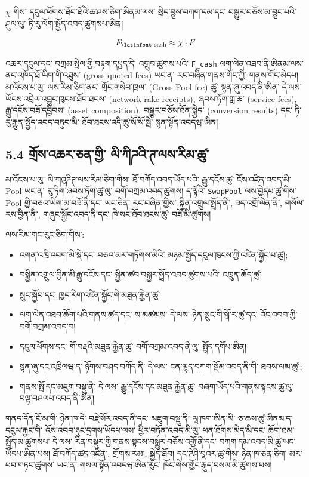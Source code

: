 \documentclass[11pt]{article}
\begin{document}
\texttt{$\chi$} གིས་ དངུལ་ཕོགས་ཐོབ་ཐོའི་ཆ་ཤས་ཅིག་ཨིནམ་ལས་ སྲིད་བྱུས་བཀག་དམ་དང་ བསྒྱུར་བཅོས་མ་བྱུང་པའི་ཤུལ་ལུ་ ཏི་རུ་ལོག་སྤྱོད་འབད་ཚུགསཔ་ཨིན།

\[
F_{\text{\latinfont cash}} \approx \chi \cdot F
\]

འཆར་དངུལ་དང་ བཀྲམ་སྤེལ་གྱི་བརྟག་དཔྱད་དེ་ འགྲུབ་ཚུགས་པའི་ \texttt{F\_cash} ལག་ལེན་འཐབ་ནི་ཨིནམ་ལས་ ནང་འཁོད་ཐོ་ཡིག་གི་འཐུས་ (gross quoted fees) ཡང་ན་ རང་བཞིན་གནས་གོང་ཀྱི་ གནས་གོང་མེདཔ། མ་འོངས་པ་ལུ་ ལས་རིམ་ཅིག་ནང་ གྲོང་གསེབ་ཁྲལ་ (Gross Pool fee) ཚུ་ སྙན་ཞུ་འབད་ནི་ཨིན་ དེ་ལས་ ཡོངས་འབྲེལ་འབྱུང་ཁུངས་ཐོབ་ཐངས་ (network-rake receipts), ཞབས་ཏོག་གླ་ཆ་ (service fees), རྒྱུ་དངོས་བཟོ་དབྱིབས་ (asset composition), བསྒྱུར་བཅོས་ཐོན་སྐྱེད་ (conversion results) དང་ ཏི་རུ་རྒྱུན་སྤྱོད་འབད་བཏུབ་མི་ ཐོབ་ཐངས་འདི་ཚུ་སོ་སོ་སྦེ་ སྙན་སྟོན་འབདཝ་ཨིན།

\subsection*{5.4 གྲོས་འཆར་ཅན་གྱི་ ལི་ཀིཌའི་ཊ་ལས་རིམ་ཚུ་}

མ་འོངས་པ་ལུ་ ལི་ཀའུཌིཊ་ལས་རིམ་ཅིག་གིས་ ཐོ་བཀོད་འབད་ཡོད་པའི་ རྒྱུ་དངོས་ཚུ་ ངོས་འཛིན་འབད་མི་ Pool ཡང་ན་ རུ་ཏིག་ཞབས་ཏོག་ཚུ་ལུ་ བགོ་བཀྲམ་འབད་ཚུགས། ད་ལྟོའི་ \texttt{SwapPool} ལས་བྱེདཔ་ཚུ་གིས་ Pool གྱི་བཅའ་ཡིག་མ་བཟོ་ནི་དང་ ཡང་ཅིན་ རང་བཞིན་གྱིས་ སྐྱིན་འགྲུལ་སྤྲོད་ནི་, ཟད་འགྲོ་ལེན་ནི་, གསོལ་རས་བྱིན་ནི་, གཞུང་སྐྱོང་འབད་ནི་དང་ ཁེ་སང་ཐོབ་ཐངས་ཚུ་ བཟོ་མི་ཚུགས།

ལས་རིམ་གང་རུང་ཅིག་གིས་:

\begin{itemize}[leftmargin=*]
\item འགན་འཁྲི་འབག་མི་སྡེ་དང་ བཅའ་མར་གཏོགས་མིའི་ མཉམ་སྤྱོད་དངུལ་ཁུངས་ཀྱི་འཛིན་སྐྱོང་པ་ཚུ།;
\item བསྐྱིན་འགྲུལ་བྱིན་མི་རྒྱུ་དངོས་དང་ སྐྱིན་ཚབ་བསྐྱར་སྤྲོད་འབད་ཚུགས་པའི་ འཁྲུན་ཆོད་ཚུ་
\item སྲུང་སྐྱོབ་དང་ ཁྱད་རིག་འཛིན་སྐྱོང་གི་མཐུན་རྐྱེན་ཚུ་
\item ལག་ལེན་འཐབ་ཆོག་པའི་གནས་ཚད་དང་ ས་མཚམས་ དེ་ལས་ ཉེན་སྲུང་གི་སྒོ་ར་ཚུ་དང་ འོང་འབབ་ཀྱི་བགོ་བཀྲམ་འབད་བ།
\item དངུལ་ཕོགས་དང་ གོ་བརྡའི་མཐུན་རྐྱེན་ཚུ་ བགོ་བཀྲམ་འབད་ནི་ལུ་ སྤྲོད་དགོཔ་ཨིན།
\item སྙན་ཞུ་དང་འཁྲིལཝ་ད་ ཉོགས་བཤད་བཀོད་ནི་ དེ་ལས་ ངན་ལྷད་བཀག་སྡོམ་འབད་ནི་གི་ ཐབས་ལམ་ཚུ་;
\item གནས་སྤོ་དང་མཇུག་བསྡུ་ནི་ དེ་ལས་ རྒྱུ་དངོས་དང་མཐུན་རྐྱེན་ཚུ་ བཞག་ཡོད་པའི་གནས་སྟངས་ཚུ་ལུ་ བལྟ་བཤལཔ་འབད་ནི་ཨིན།
\end{itemize}
གནད་དོན་ངོ་མ་གི་ ཉེན་ཁ་དེ་ བརྗེ་སོར་འབད་ནི་དང་ མཇུག་བསྡུ་ནི་ ལཱ་ཁག་ཨིན་མི་ ཅ་ཆས་ཚུ་ཨིནམ་ད་ དངུལ་རྐྱང་གི་ འོས་འབབ་ཉུང་དྲགས་ཡོདཔ་ལས་ ཕྱིར་བཏོན་འབད་མི་ལུ་ ཕན་ཐོགས་མེད་མི་དང་ ཆོག་ཐམ་སྤྲོད་མ་ཚུགསཔ་ དེ་ལས་ རིན་བསྡུར་གྱི་གནས་སྟངས་བསྒྱུར་བཅོས་འགྱོ་ནི་དང་ བཀག་དམ་འབད་མི་ཚུ་ཡང་ ཡོདཔ་ཨིན་པས། ཐོ་བཀོད་ཚད་འཛིན་, གྲོགས་རམ་, སྐྱེད་ཐོབ། དང་ཌེཤི་བཱའར་ཚུ་གིས་ ཉེན་ཁ་ཅན་ཅིག་ མར་ཕབ་གཏང་ཚུགས་ ཡང་ན་ གསལ་སྟོན་འབདཝ་ཨིན་རུང་ ཁོང་གིས་གྱོང་རྒུད་བསལ་མི་ཚུགས་པས།
\end{document}
